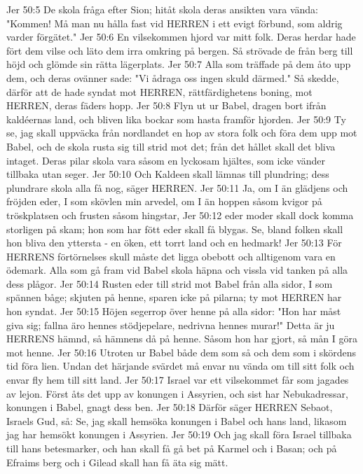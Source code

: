 Jer 50:5  De skola fråga efter Sion; hitåt skola deras ansikten vara vända: "Kommen! Må man nu hålla fast vid HERREN i ett evigt förbund, som aldrig varder förgätet."
Jer 50:6  En vilsekommen hjord var mitt folk. Deras herdar hade fört dem vilse och läto dem irra omkring på bergen. Så strövade de från berg till höjd och glömde sin rätta lägerplats.
Jer 50:7  Alla som träffade på dem åto upp dem, och deras ovänner sade: "Vi ådraga oss ingen skuld därmed." Så skedde, därför att de hade syndat mot HERREN, rättfärdighetens boning, mot HERREN, deras fäders hopp.
Jer 50:8  Flyn ut ur Babel, dragen bort ifrån kaldéernas land, och bliven lika bockar som hasta framför hjorden.
Jer 50:9  Ty se, jag skall uppväcka från nordlandet en hop av stora folk och föra dem upp mot Babel, och de skola rusta sig till strid mot det; från det hållet skall det bliva intaget. Deras pilar skola vara såsom en lyckosam hjältes, som icke vänder tillbaka utan seger.
Jer 50:10  Och Kaldeen skall lämnas till plundring; dess plundrare skola alla få nog, säger HERREN.
Jer 50:11  Ja, om I än glädjens och fröjden eder, I som skövlen min arvedel, om I än hoppen såsom kvigor på tröskplatsen och frusten såsom hingstar,
Jer 50:12  eder moder skall dock komma storligen på skam; hon som har fött eder skall få blygas. Se, bland folken skall hon bliva den yttersta - en öken, ett torrt land och en hedmark!
Jer 50:13  För HERRENS förtörnelses skull måste det ligga obebott och alltigenom vara en ödemark. Alla som gå fram vid Babel skola häpna och vissla vid tanken på alla dess plågor.
Jer 50:14  Rusten eder till strid mot Babel från alla sidor, I som spännen båge; skjuten på henne, sparen icke på pilarna; ty mot HERREN har hon syndat.
Jer 50:15  Höjen segerrop över henne på alla sidor: "Hon har måst giva sig; fallna äro hennes stödjepelare, nedrivna hennes murar!" Detta är ju HERRENS hämnd, så hämnens då på henne. Såsom hon har gjort, så mån I göra mot henne.
Jer 50:16  Utroten ur Babel både dem som så och dem som i skördens tid föra lien. Undan det härjande svärdet må envar nu vända om till sitt folk och envar fly hem till sitt land.
Jer 50:17  Israel var ett vilsekommet får som jagades av lejon. Först åts det upp av konungen i Assyrien, och sist har Nebukadressar, konungen i Babel, gnagt dess ben.
Jer 50:18  Därför säger HERREN Sebaot, Israels Gud, så: Se, jag skall hemsöka konungen i Babel och hans land, likasom jag har hemsökt konungen i Assyrien.
Jer 50:19  Och jag skall föra Israel tillbaka till hans betesmarker, och han skall få gå bet på Karmel och i Basan; och på Efraims berg och i Gilead skall han få äta sig mätt.
